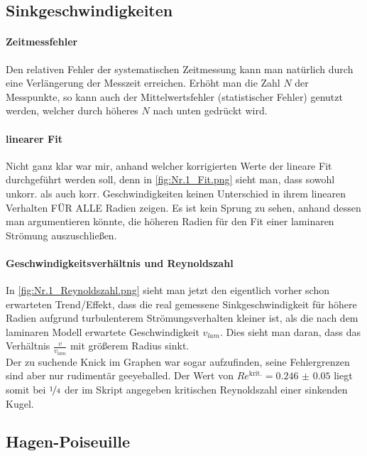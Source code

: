 \subsection{Sinkgeschwindigkeiten}
\paragraph{Zeitmessfehler}
Den relativen Fehler der systematischen Zeitmessung kann man natürlich durch eine Verlängerung der Messzeit erreichen. Erhöht man die Zahl \(N\) der Messpunkte, so kann auch der Mittelwertsfehler (statistischer Fehler) genutzt werden, welcher durch höheres \(N\) nach unten gedrückt wird.
\paragraph{linearer Fit}
Nicht ganz klar war mir, anhand welcher korrigierten Werte der lineare Fit durchgeführt werden soll, denn in \cref{fig:Nr.1_Fit.png} sieht man, dass sowohl unkorr. als auch korr. Geschwindigkeiten keinen Unterschied in ihrem linearen Verhalten FÜR ALLE Radien zeigen. Es ist kein Sprung zu sehen, anhand dessen man argumentieren könnte, die höheren Radien für den Fit einer laminaren Strömung auszuschließen. 
\paragraph{Geschwindigkeitsverhältnis und Reynoldszahl}
In \cref{fig:Nr.1_Reynoldszahl.png} sieht man jetzt den eigentlich vorher schon erwarteten Trend/Effekt, dass die real gemessene Sinkgeschwindigkeit für höhere Radien aufgrund turbulenterem Strömungsverhalten kleiner ist, als die nach dem laminaren Modell erwartete Geschwindigkeit \(v_{lam}\). Dies sieht man daran, dass das Verhältnis \(\frac{v}{v_{lam}}\) mit größerem Radius sinkt.\\
Der zu suchende Knick im Graphen war sogar aufzufinden, seine Fehlergrenzen sind aber nur rudimentär geeyeballed. Der Wert von \(Re^\mathrm{krit.}=\num{0.246(50)}\) liegt somit bei \(\nicefrac{1}{4}\) der im Skript\autocite{Skript_2.1} angegeben kritischen Reynoldszahl einer sinkenden Kugel.

\subsection{Hagen-Poiseuille}
